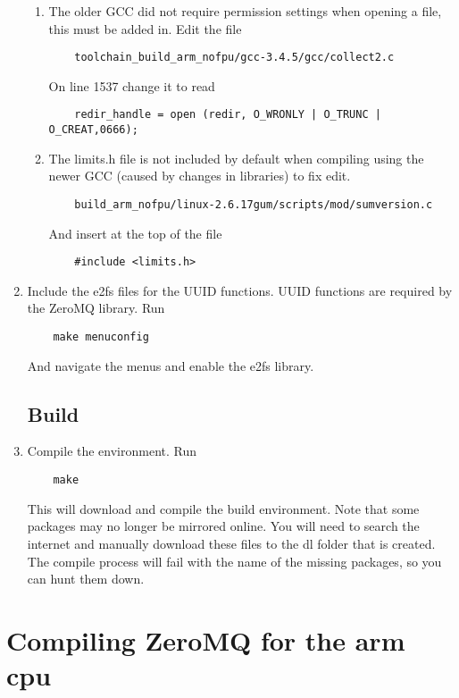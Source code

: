 \begin{enumerate}
\begin{enumerate}
	\item The older GCC did not require permission settings when opening a file, this must be added in. Edit the file
\begin{verbatim}
	toolchain_build_arm_nofpu/gcc-3.4.5/gcc/collect2.c
\end{verbatim}
	On line 1537 change it to read
\begin{verbatim}
	redir_handle = open (redir, O_WRONLY | O_TRUNC | O_CREAT,0666);
\end{verbatim}

	\item The limits.h file is not included by default when compiling using the newer GCC (caused by changes in libraries) to fix edit.
\begin{verbatim}
	build_arm_nofpu/linux-2.6.17gum/scripts/mod/sumversion.c
\end{verbatim}
	And insert at the top of the file
\begin{verbatim}
	#include <limits.h>
\end{verbatim}
\end{enumerate}

	\item Include the e2fs files for the UUID functions. UUID functions are required by the ZeroMQ library. Run
\begin{verbatim}
	make menuconfig
\end{verbatim}
	And navigate the menus and enable the e2fs library.

\subsection{Build}
	\item Compile the environment. Run 
\begin{verbatim}
	make 
\end{verbatim}
	This will download and compile the build environment. Note that some packages may no longer be mirrored online. You will need to search the internet and manually download these files to the dl folder that is created. The compile process will fail with the name of the missing packages, so you can hunt them down.

\end{enumerate}

\section{Compiling ZeroMQ for the arm cpu}

